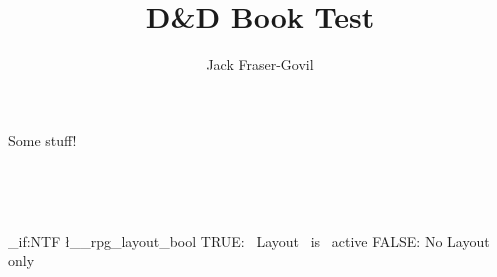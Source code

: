 \documentclass[theme=dnd,8pt,layout=false,bg=none]{rpgbook}
\title{D\&D Book Test}
\author{Jack Fraser-Govil}
\begin{document}
    \maketitle

    Some stuff!  

         \ExplSyntaxOn 
    ~

    ~
    
    \bool_if:NTF \l__rpg_layout_bool
        {TRUE:~ Layout ~is~ active}
        {FALSE: No Layout only}
         \ExplSyntaxOff
\end{document}
